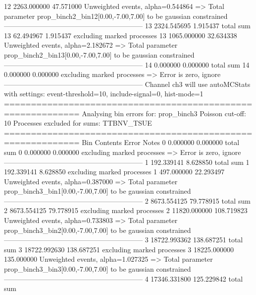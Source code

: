 12         2263.000000     47.571000       Unweighted events, alpha=0.544864
  => Total parameter prop_binch2_bin12[0.00,-7.00,7.00] to be gaussian constrained
------------------------------------------------------------
13         2324.545695     1.915437        total sum                     
13         62.494967       1.915437        excluding marked processes    
13         1065.000000     32.634338       Unweighted events, alpha=2.182672
  => Total parameter prop_binch2_bin13[0.00,-7.00,7.00] to be gaussian constrained
------------------------------------------------------------
14         0.000000        0.000000        total sum                     
14         0.000000        0.000000        excluding marked processes    
  => Error is zero, ignore      
------------------------------------------------------------
Channel ch3 will use autoMCStats with settings: event-threshold=10, include-signal=0, hist-mode=1
============================================================
Analysing bin errors for: prop_binch3
Poisson cut-off: 10
Processes excluded for sums: TTBNV_TSUE
============================================================
Bin        Contents        Error           Notes                         
0          0.000000        0.000000        total sum                     
0          0.000000        0.000000        excluding marked processes    
  => Error is zero, ignore      
------------------------------------------------------------
1          192.339141      8.628850        total sum                     
1          192.339141      8.628850        excluding marked processes    
1          497.000000      22.293497       Unweighted events, alpha=0.387000
  => Total parameter prop_binch3_bin1[0.00,-7.00,7.00] to be gaussian constrained
------------------------------------------------------------
2          8673.554125     79.778915       total sum                     
2          8673.554125     79.778915       excluding marked processes    
2          11820.000000    108.719823      Unweighted events, alpha=0.733803
  => Total parameter prop_binch3_bin2[0.00,-7.00,7.00] to be gaussian constrained
------------------------------------------------------------
3          18722.993362    138.687251      total sum                     
3          18722.992630    138.687251      excluding marked processes    
3          18225.000000    135.000000      Unweighted events, alpha=1.027325
  => Total parameter prop_binch3_bin3[0.00,-7.00,7.00] to be gaussian constrained
------------------------------------------------------------
4          17346.331800    125.229842      total sum                     
